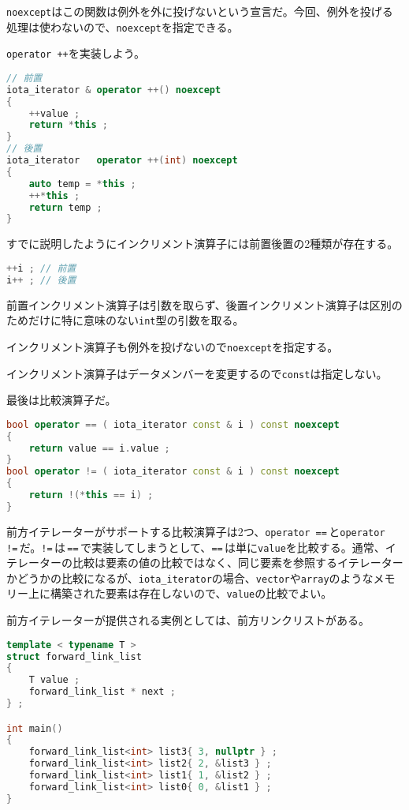 \texttt{noexcept}はこの関数は例外を外に投げないという宣言だ。今回、例外を投げる処理は使わないので、\texttt{noexcept}を指定できる。

\texttt{operator ++}を実装しよう。

\begin{lstlisting}[language={C++}]
// 前置
iota_iterator & operator ++() noexcept
{
    ++value ;
    return *this ;
}
// 後置
iota_iterator   operator ++(int) noexcept
{
    auto temp = *this ;
    ++*this ;
    return temp ;
}
\end{lstlisting}

すでに説明したようにインクリメント演算子には前置後置の2種類が存在する。

\begin{lstlisting}[language={C++}]
++i ; // 前置
i++ ; // 後置
\end{lstlisting}

前置インクリメント演算子は引数を取らず、後置インクリメント演算子は区別のためだけに特に意味のない\texttt{int}型の引数を取る。

インクリメント演算子も例外を投げないので\texttt{noexcept}を指定する。

インクリメント演算子はデータメンバーを変更するので\texttt{const}は指定しない。

最後は比較演算子だ。

\begin{lstlisting}[language={C++}]
bool operator == ( iota_iterator const & i ) const noexcept
{
    return value == i.value ;
}
bool operator != ( iota_iterator const & i ) const noexcept
{
    return !(*this == i) ;
}
\end{lstlisting}

前方イテレーターがサポートする比較演算子は2つ、\texttt{operator ==}\,と\texttt{operator !=}\,だ。\texttt{!=}\,は\,\texttt{==}\,で実装してしまうとして、\texttt{==}\,は単に\texttt{value}を比較する。通常、イテレーターの比較は要素の値の比較ではなく、同じ要素を参照するイテレーターかどうかの比較になるが、\texttt{iota\_iterator}の場合、\texttt{vector}や\texttt{array}のようなメモリー上に構築された要素は存在しないので、\texttt{value}の比較でよい。

前方イテレーターが提供される実例としては、前方リンクリストがある。

\begin{lstlisting}[language={C++}]
template < typename T >
struct forward_link_list
{
    T value ;
    forward_link_list * next ;
} ;

int main()
{
    forward_link_list<int> list3{ 3, nullptr } ;
    forward_link_list<int> list2{ 2, &list3 } ;
    forward_link_list<int> list1{ 1, &list2 } ;
    forward_link_list<int> list0{ 0, &list1 } ;
}
\end{lstlisting}

